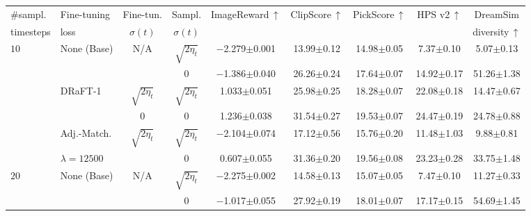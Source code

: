 \begin{table}[h!]
\centering
{\footnotesize
\begin{tabular}{llccccccc}
    \toprule
    $\#$sampl. & Fine-tuning & Fine-tun. & Sampl. & \multirow{2}{*}{ImageReward$\, \uparrow$} & \multirow{2}{*}{ClipScore$\, \uparrow$} & \multirow{2}{*}{PickScore$\, \uparrow$} & \multirow{2}{*}{HPS v2$\, \uparrow$} & DreamSim \\
    timesteps & loss & $\sigma(t)$ & $\sigma(t)$ &  &  &  &  & diversity$\, \uparrow$ \\
    \midrule
    \multirow{6}{*}{$10$} & \multirow{2}{*}{None (Base)} & \multirow{2}{*}{N/A} & $\sqrt{2 \eta_t}$ & $-$2.279{\tiny$\pm$0.001} & 13.99{\tiny$\pm$0.12} & 14.98{\tiny$\pm$0.05} & 7.37{\tiny$\pm$0.10} & 5.07{\tiny$\pm$0.13} \\
                            &     &                     & 0                 & $-$1.386{\tiny$\pm$0.040} & 26.26{\tiny$\pm$0.24} & 17.64{\tiny$\pm$0.07} & 14.92{\tiny$\pm$0.17} & 51.26{\tiny$\pm$1.38} \\
    \addlinespace
     & \multirow{2}{*}{DRaFT-1}           & $\sqrt{2 \eta_t}$ & $\sqrt{2 \eta_t}$ & 1.033{\tiny$\pm$0.051} & 25.98{\tiny$\pm$0.25} & 18.28{\tiny$\pm$0.07} & 22.08{\tiny$\pm$0.18} & 14.47{\tiny$\pm$0.67} \\
                                    &   & 0                 & 0                 & 1.236{\tiny$\pm$0.038} & 31.54{\tiny$\pm$0.27} & 19.53{\tiny$\pm$0.07} & 24.47{\tiny$\pm$0.19} & 24.78{\tiny$\pm$0.88} \\
    \addlinespace
     & Adj.-Match.  & \multirow{2}{*}{$\sqrt{2 \eta_t}$} & $\sqrt{2 \eta_t}$ & $-$2.104{\tiny$\pm$0.074} & 17.12{\tiny$\pm$0.56} & 15.76{\tiny$\pm$0.20} & 11.48{\tiny$\pm$1.03} & 9.88{\tiny$\pm$0.81} \\
     & $\lambda = 12500$                     &                                    & 0                 & 0.607{\tiny$\pm$0.055} & 31.36{\tiny$\pm$0.20} & 19.56{\tiny$\pm$0.08} & 23.23{\tiny$\pm$0.28} & 33.75{\tiny$\pm$1.48} \\
    \midrule
    \multirow{6}{*}{$20$} & \multirow{2}{*}{None (Base)} & \multirow{2}{*}{N/A} & $\sqrt{2 \eta_t}$ & $-$2.275{\tiny$\pm$0.002} & 14.58{\tiny$\pm$0.13} & 15.07{\tiny$\pm$0.05} & 7.47{\tiny$\pm$0.10} & 11.27{\tiny$\pm$0.33} \\
                         &        &                     & 0                 &  $-$1.017{\tiny$\pm$0.055} & 27.92{\tiny$\pm$0.19} & 18.01{\tiny$\pm$0.07} & 17.17{\tiny$\pm$0.15} & 54.69{\tiny$\pm$1.45} \\

\end{tabular}}
\end{table}
